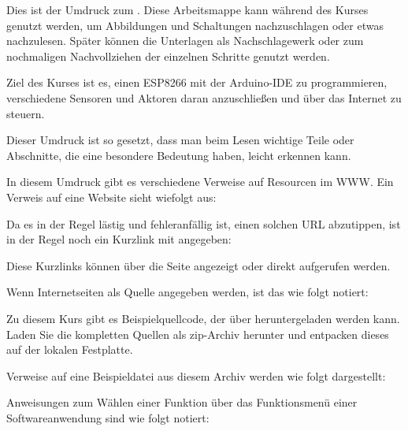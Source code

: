 
Dies ist der Umdruck zum \coursename. Diese Arbeitsmappe kann während
des Kurses genutzt werden, um Abbildungen und Schaltungen nachzuschlagen oder etwas nachzulesen.
Später können die Unterlagen als Nachschlagewerk oder zum nochmaligen Nachvollziehen der einzelnen 
Schritte genutzt werden.

Ziel des Kurses ist es, einen ESP8266 mit der Arduino-IDE zu programmieren, verschiedene Sensoren
und Aktoren daran anzuschließen und über das Internet zu steuern. 


Dieser Umdruck ist so gesetzt, dass man beim Lesen wichtige Teile oder Abschnitte, die eine besondere Bedeutung 
haben, leicht erkennen kann.

In diesem Umdruck gibt es verschiedene Verweise auf Resourcen im WWW. Ein Verweis auf eine Website sieht wiefolgt aus:

\noindent{}

Da es in der Regel lästig und fehleranfällig ist, einen solchen URL abzutippen, ist in der Regel noch ein Kurzlink mit 
angegeben:

\noindent{}

Diese Kurzlinks können über die Seite  angezeigt oder direkt aufgerufen werden.

Wenn Internetseiten als Quelle angegeben werden, ist das wie folgt notiert:

\noindent{}

Zu diesem Kurs gibt es Beispielquellcode, der über 
heruntergeladen werden kann. Laden Sie die kompletten Quellen als zip-Archiv
herunter und entpacken dieses auf der lokalen Festplatte.

Verweise auf eine Beispieldatei aus diesem Archiv werden wie folgt  dargestellt:

\noindent{}


Anweisungen zum Wählen einer Funktion über das Funktionsmenü einer Softwareanwendung sind wie folgt notiert:

\noindent{}

